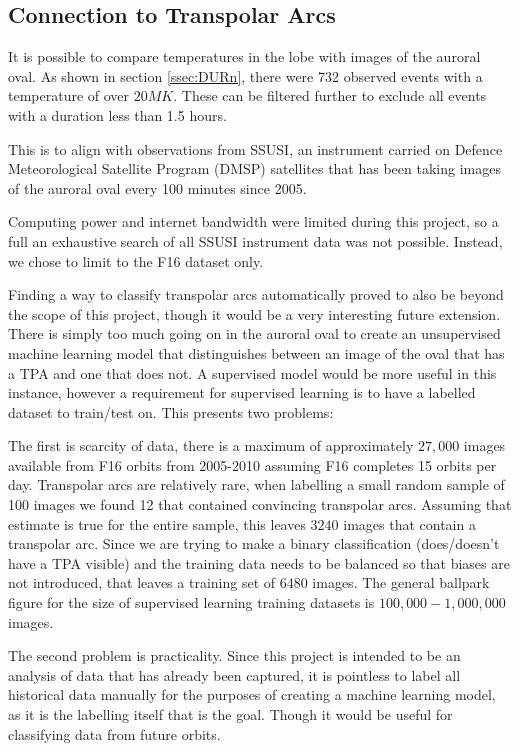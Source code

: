 \documentclass[12pt]{article}
\begin{document}
\subsection{Connection to Transpolar Arcs}
It is possible to compare temperatures in the lobe with images of the auroral oval. As shown in section \ref{ssec:DURn}, there were 732 observed events with a temperature of over $20MK$. These can be filtered further to exclude all events with a duration less than 1.5 hours. 

This is to align with observations from SSUSI, an instrument carried on Defence Meteorological Satellite Program (DMSP) satellites that has been taking images of the auroral oval every 100 minutes since 2005. 

Computing power and internet bandwidth were limited during this project, so a full an exhaustive search of all SSUSI instrument data was not possible. Instead, we chose to limit to the F16 dataset only.

Finding a way to classify transpolar arcs automatically proved to also be beyond the scope of this project, though it would be a very interesting future extension. There is simply too much going on in the auroral oval to create an unsupervised machine learning model that distinguishes between an image of the oval that has a TPA and one that does not. A supervised model would be more useful in this instance, however a requirement for supervised learning is to have a labelled dataset to train/test on. This presents two problems:

The first is scarcity of data, there is a maximum of approximately $27,000$ images available from F16 orbits from 2005-2010 assuming F16 completes 15 orbits per day. Transpolar arcs are relatively rare, when labelling a small random sample of 100 images we found 12 that contained convincing transpolar arcs. Assuming that estimate is true for the entire sample, this leaves $3240$ images that contain a transpolar arc. Since we are trying to make a binary classification (does/doesn't have a TPA visible) and the training data needs to be balanced so that biases are not introduced, that leaves a training set of $6480$ images. The general ballpark figure for the size of supervised learning training datasets is $100,000-1,000,000$ images.

The second problem is practicality. Since this project is intended to be an analysis of data that has already been captured, it is pointless to label all historical data manually for the purposes of creating a machine learning model, as it is the labelling itself that is the goal. Though it would be useful for classifying data from future orbits.
\end{document}
